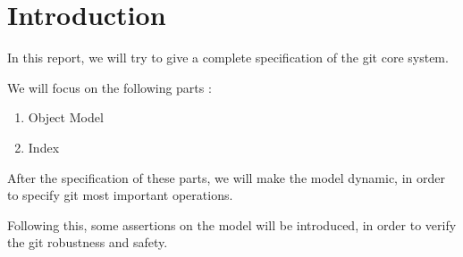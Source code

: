 \section{Introduction}

In this report, we will try to give a complete specification
of the git core system. \par
We will focus on the following parts :

\begin{enumerate}
	\item Object Model
	\item Index
\end{enumerate}

After the specification of these parts, we will make the
model dynamic, in order to specify git most important operations.

Following this, some assertions on the model will be
introduced, in order
to verify the git robustness and safety. \par 
